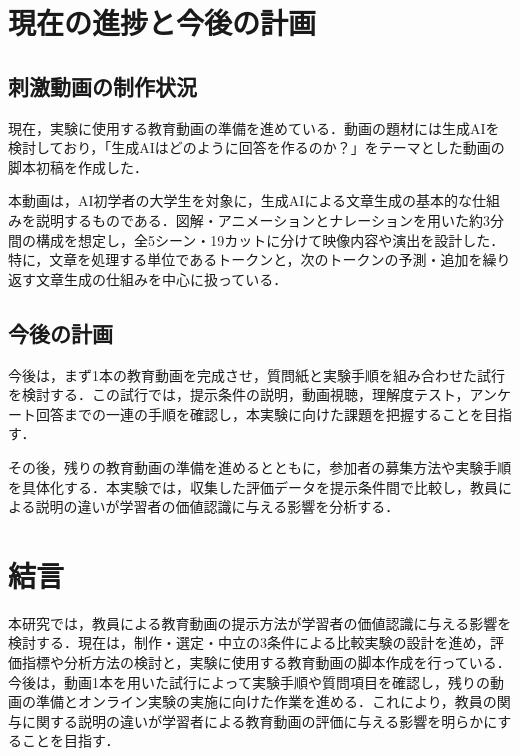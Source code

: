 \documentclass[11pt]{ltjarticle}
\begin{document}
\section{現在の進捗と今後の計画}

\subsection{刺激動画の制作状況}

現在，実験に使用する教育動画の準備を進めている．動画の題材には生成AIを検討しており，「生成AIはどのように回答を作るのか？」をテーマとした動画の脚本初稿を作成した．

本動画は，AI初学者の大学生を対象に，生成AIによる文章生成の基本的な仕組みを説明するものである．図解・アニメーションとナレーションを用いた約3分間の構成を想定し，全5シーン・19カットに分けて映像内容や演出を設計した．特に，文章を処理する単位であるトークンと，次のトークンの予測・追加を繰り返す文章生成の仕組みを中心に扱っている．

\subsection{今後の計画}

今後は，まず1本の教育動画を完成させ，質問紙と実験手順を組み合わせた試行を検討する．この試行では，提示条件の説明，動画視聴，理解度テスト，アンケート回答までの一連の手順を確認し，本実験に向けた課題を把握することを目指す．

その後，残りの教育動画の準備を進めるとともに，参加者の募集方法や実験手順を具体化する．本実験では，収集した評価データを提示条件間で比較し，教員による説明の違いが学習者の価値認識に与える影響を分析する．



\section{結言}

本研究では，教員による教育動画の提示方法が学習者の価値認識に与える影響を検討する．現在は，制作・選定・中立の3条件による比較実験の設計を進め，評価指標や分析方法の検討と，実験に使用する教育動画の脚本作成を行っている．今後は，動画1本を用いた試行によって実験手順や質問項目を確認し，残りの動画の準備とオンライン実験の実施に向けた作業を進める．これにより，教員の関与に関する説明の違いが学習者による教育動画の評価に与える影響を明らかにすることを目指す．
\end{document}
